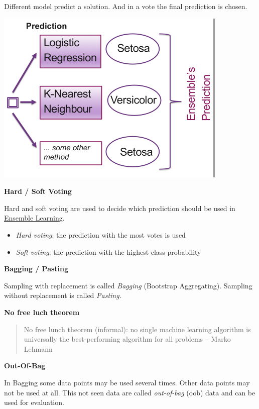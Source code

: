 \documentclass[11pt,twoside,landscape]{article}
\begin{document}
\begin{multicols}{3}
Different model predict a solution.
And in a vote the final prediction is chosen.

\begin{center}
\includegraphics[width=.9\linewidth]{img/ensemble_learning_example.png}
\end{center}


\textbf{Hard / Soft Voting}

Hard and soft voting are used to decide which prediction should be used in \href{../../../roam/20211228090232-ensemble_learning.org}{Ensemble Learning}.
\begin{itemize}
\item \emph{Hard voting}: the prediction with the most votes is used
\item \emph{Soft voting}: the prediction with the highest class probability
\end{itemize}


\textbf{Bagging / Pasting}

Sampling with replacement is called \emph{Bagging} (Bootstrap Aggregating).
Sampling without replacement is called \emph{Pasting}.


\textbf{No free luch theorem}

\begin{quote}
No free lunch theorem (informal): no single machine learning algorithm is universally the best-performing algorithm for all problems
-- Marko Lehmann
\end{quote}


\textbf{Out-Of-Bag}

In Bagging some data points may be used several times.
Other data points may not be used at all.
This not seen data are called \emph{out-of-bag} (oob) data and can be used for evaluation.

\end{multicols}
\end{document}
